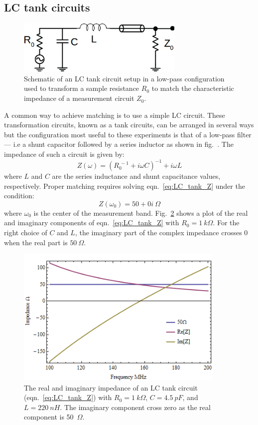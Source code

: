 \subsection{LC tank circuits}
\begin{figure}
\centering
\includegraphics[width=80mm]{figures/Johnson_noise_thermometry/schematic_matching.png}
\caption{Schematic of an LC tank circuit setup in a low-pass configuration used to transform a sample resistance $R_0$ to match the characteristic impedance of a measurement circuit $Z_0$.}
\label{fig:schematic_matching}
\end{figure}
A common way to achieve matching is to use a simple LC circuit. These transformation circuits, known as a tank circuits, can be arranged in several ways but the configuration most useful to these experiments is that of a low-pass filter --- i.e a shunt capacitor followed by a series inductor as shown in fig.~\cite{fig:schematic_matching}. The impedance of such a circuit is given by:
\begin{equation}\label{eq:LC_tank_Z}
Z(\omega) = \left(R_0^{~-1}+i\omega C\right)^{-1}+i\omega L
\end{equation}
where $L$ and $C$ are the series inductance and shunt capacitance values, respectively. Proper matching requires solving eqn.~\ref{eq:LC_tank_Z} under the condition:
\begin{equation}\label{eq:LC_tank_constraint}
Z(\omega_0) = 50+0i~\Omega 
\end{equation}
where $\omega_0$ is the center of the measurement band. Fig.~\ref{fig:LC_tank_Z} shows a plot of the real and imaginary components of eqn.~\ref{eq:LC_tank_Z} with $R_0 = 1~k\Omega$. For the right choice of $C$ and $L$, the imaginary part of the complex impedance crosses $0$ when the real part is $50~\Omega$.
\begin{figure}
\centering
\includegraphics[width=100mm]{figures/Johnson_noise_thermometry/Impedance_matching2.png}
\caption{The real and imaginary impedance of an LC tank circuit (eqn.~\ref{eq:LC_tank_Z}) with $R_0=1~k\Omega$, $C = 4.5~pF$, and $L = 220~nH$. The imaginary component cross zero as the real component is 50~$\Omega$.}
\label{fig:LC_tank_Z}
\end{figure}
